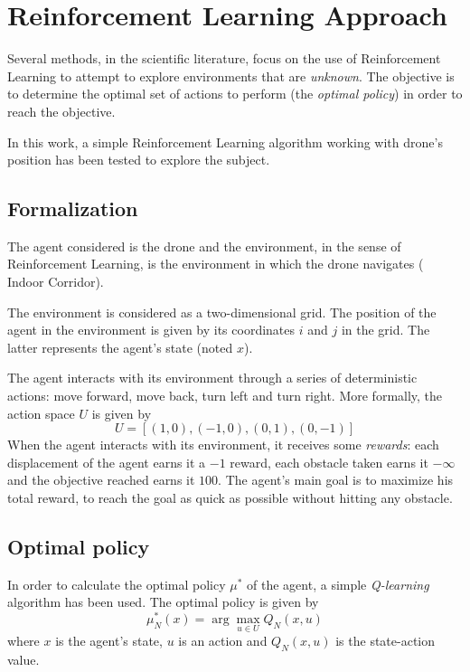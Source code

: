 \chapter{Reinforcement Learning Approach}\label{ch:reinforcement.learning.approach}

Several methods, in the scientific literature, focus on the use of Reinforcement Learning to attempt to explore environments that are \emph{unknown}. The objective is to determine the optimal set of actions to perform (the \emph{optimal policy}) in order to reach the objective.

In this work, a simple Reinforcement Learning algorithm working with drone's position has been tested to explore the subject.

\section{Formalization}

The agent considered is the drone and the environment, in the sense of Reinforcement Learning, is the environment in which the drone navigates (\eg{} Indoor Corridor).

The environment is considered as a two-dimensional grid. The position of the agent in the environment is given by its coordinates $i$ and $j$ in the grid. The latter represents the agent's state (noted $x$).

The agent interacts with its environment through a series of deterministic actions: move forward, move back, turn left and turn right. More formally, the action space $U$ is given by
\begin{equation}
    U = [(1, 0), (-1, 0), (0, 1), (0, -1)]
\end{equation}
When the agent interacts with its environment, it receives some \emph{rewards}: each displacement of the agent earns it a $-1$ reward, each obstacle taken earns it $-\infty$ and the objective reached earns it $100$. The agent's main goal is to maximize his total reward, \ie{} to reach the goal as quick as possible without hitting any obstacle.

\section{Optimal policy}

In order to calculate the optimal policy $\mu^*$ of the agent, a simple \emph{Q-learning} algorithm has been used. The optimal policy is given by
\begin{equation}
    \mu^*_N(x) = \arg\max_{u \in U}Q_N(x, u)
\end{equation}
where $x$ is the agent's state, $u$ is an action and $Q_N(x, u)$ is the state-action value.

